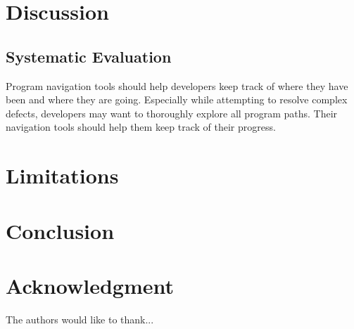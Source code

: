 \documentclass[conference]{IEEEtran}
\begin{document}
\section{Discussion}


\subsection{Systematic Evaluation}
Program navigation tools should help developers keep track of where they have been and where they are going. Especially while attempting to resolve complex defects, developers may want to thoroughly explore all program paths. Their navigation tools should help them keep track of their progress.


\section{Limitations}

\section{Conclusion}

\section*{Acknowledgment}

The authors would like to thank...













\end{document}
